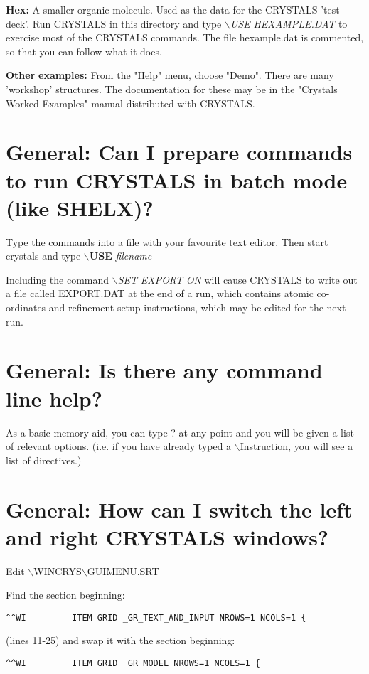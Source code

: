 \documentclass[10pt,a4paper]{report}
\begin{document}
{\bf Hex:} A smaller organic molecule. Used as the
data for the CRYSTALS 'test deck'. Run CRYSTALS in this directory and
type \emph{$\backslash$USE} \emph{HEXAMPLE.DAT} to exercise most of the CRYSTALS commands.
The file hexample.dat is commented, so that you can follow what it
does.


{\bf Other} {\bf examples:} From the "Help" menu, choose "Demo". There are
many 'workshop' structures. The documentation for these may be in
the "Crystals Worked Examples" manual distributed with CRYSTALS.


\section{General: Can I prepare commands to run CRYSTALS in batch mode (like SHELX)?}


Type the commands into a file with your favourite text editor. Then
start crystals and type {\bf $\backslash$USE} \emph{filename}



Including the command \emph{$\backslash$SET} \emph{EXPORT} \emph{ON} will
cause CRYSTALS to write out a file called EXPORT.DAT at
the end of a run, which contains atomic co-ordinates and
refinement setup instructions, which may be edited for the next run.

\section{General: Is there any command line help?}


As a basic memory aid, you can type ? at any point and
you will be given a list of relevant options. (i.e. if you
have already typed a $\backslash$Instruction, you will see a list of directives.)

\section{General: How can I switch the left and right CRYSTALS windows?}



Edit $\backslash$WINCRYS$\backslash$GUIMENU.SRT



Find the section beginning:
\small\begin{verbatim}
^^WI         ITEM GRID _GR_TEXT_AND_INPUT NROWS=1 NCOLS=1 {
\end{verbatim}\normalsize

(lines 11-25) and swap it with the section beginning:
\small\begin{verbatim}
^^WI         ITEM GRID _GR_MODEL NROWS=1 NCOLS=1 {
\end{verbatim}\normalsize
\end{document}
